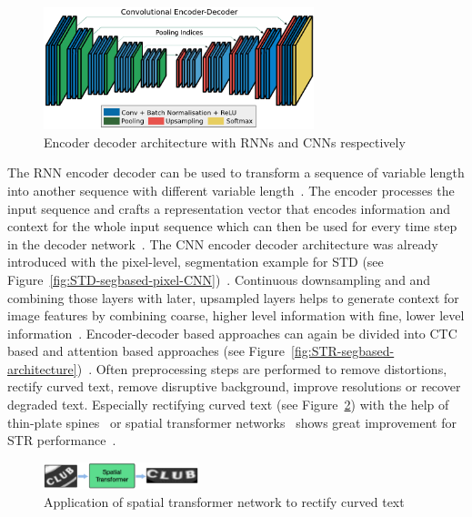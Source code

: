 \begin{figure}[h]
    \centering
    \includegraphics[width=0.7\textwidth]{img/Encoder-Decoder-Conv-Badrinarayanan-SegNet-2017.png}
    \caption[Encoder decoder architectures]{%
        Encoder decoder architecture with \acp{RNN} and \acp{CNN}
        respectively~\citep{cho_learning_2014,badrinarayanan_segnet_2017}\label{fig:enc-dec}
    }
\end{figure}
The \ac{RNN} encoder decoder can be used to transform a sequence of variable length into another
sequence with different variable length~\citep{cho_learning_2014}.
The encoder processes the input sequence and crafts a representation vector that encodes information
and context for the whole input sequence which can then be used for every time step in the decoder
network~\citep{cho_learning_2014}.
The \ac{CNN} encoder decoder architecture was already introduced with the pixel-level,
segmentation example for \ac{STD} (see
Figure~\ref{fig:STD-segbased-pixel-CNN})~\citep{deng_pixellink_2018}.
Continuous downsampling and and combining those layers with later, upsampled layers helps to generate
context for image features by combining coarse, higher level information with fine, lower level
information~\citep{long_fully_2015,badrinarayanan_segnet_2017}.
Encoder-decoder based approaches can again be divided into \ac{CTC} based and attention based
approaches (see
Figure~\ref{fig:STR-segbased-architecture})~\citep{long_scene_2021,cong_comparative_2019}.
Often preprocessing steps are performed to remove distortions, rectify curved text,
remove disruptive background, improve resolutions or recover degraded text.
Especially rectifying curved text (see Figure~\ref{fig:STN-application}) with the help of
thin-plate spines~\citep{bookstein_principal_1989} or spatial transformer
networks~\citep{jaderberg_spatial_2015} shows great improvement for \ac{STR}
performance~\citep{long_scene_2021,chen_text_2021}.
\begin{figure}[h]
    \centering
    \includegraphics[width=0.4\textwidth]{img/STN-result-Liu-STAR-2016.png}
    \caption[Text rectification application]{%
        Application of spatial transformer network to rectify curved
        text~\citep{liu_star-net_2016}\label{fig:STN-application}
    }
\end{figure}
